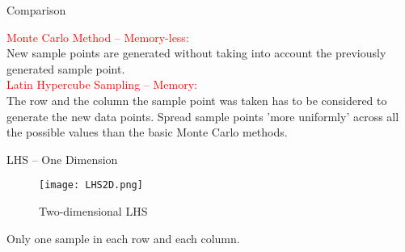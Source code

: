 \begin{frame}{Comparison}

 \textcolor{red}{Monte Carlo Method -- Memory-less:}\\
 New sample points are generated without taking into account the previously generated sample point. \\
 \textcolor{red}{Latin Hypercube Sampling -- Memory:}\\
 The row and the column the sample point was taken has to be considered to generate the new data points. Spread sample points 'more uniformly' across all the possible values than the basic Monte Carlo methods.
 
\end{frame}

\begin{frame}{LHS -- One Dimension}
\begin{figure}[ht]
		  \centering
          \texttt{[image: LHS2D.png]}
           \caption{Two-dimensional LHS}
 \end{figure}
 Only one sample in each row and each column.
\end{frame}


